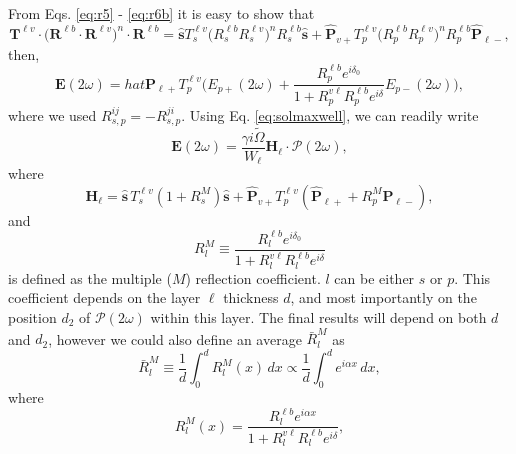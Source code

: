 From Eqs. \eqref{eq:r5} - \eqref{eq:r6b} it is easy to show that
\begin{equation*}\label{eq:m1}
\mathbf{T}^{\ell v}\cdot
\Big(\mathbf{R}^{\ell b}\cdot\mathbf{R}^{\ell v}\Big)^{n}\cdot
\mathbf{R}^{\ell b}
= \hat{\mathbf{s}}T^{\ell v}_{s}
  \Big(R^{\ell b}_{s}R^{\ell v}_{s}\Big)^{n}R^{\ell b}_{s}\hat{\mathbf{s}}
+ \hat{\mathbf{P}}_{v+}T^{\ell v}_{p}\Big(R^{\ell b}_{p}R^{\ell v}_{p}\Big)^n 
  R^{\ell b}_{p} 
\hat{\mathbf{P}}_{\ell-},
\end{equation*}
then,
\begin{equation}\label{eq:E2wreduced}
\mathbf{E}(2\omega) 
=  hat{\mathbf{P}}_{\ell +}T^{\ell v}_{p}
\Big(
E_{p+}(2\omega) +
\frac{R^{\ell b}_{p}e^{i\delta_{0}}}{1 + R^{v\ell}_{p}R^{\ell b}_{p}e^{i\delta}}
E_{p-}(2\omega) 
\Big),
\end{equation}
where we used $R^{ij}_{s,p}=-R^{ji}_{s,p}$. Using Eq. \eqref{eq:solmaxwell}, we
can readily write
\begin{equation}\label{eq:mr8}
\mathbf{E}(2\omega) =
\frac{\gamma i\tilde{\Omega}}{W_{\ell}}\mathbf{H}_{\ell}\cdot
\boldsymbol{\mathcal{P}}(2\omega),
\end{equation}
where
\begin{equation}\label{eq:mr9}
\mathbf{H}_{\ell}
= \hat{\mathbf{s}}\,T_{s}^{\ell v}
\left(1+ R^{M}_{s}\right)\hat{\mathbf{s}} + \hat{\mathbf{P}}_{v+}T_{p}^{\ell v}
\left(\hat{\mathbf{P}}_{\ell +} + R^{M}_{p}\hat{\mathbf{P}}_{\ell -}\right),
\end{equation}
and
\begin{equation}\label{m61}
R^{M}_{l}\equiv
\frac{R^{\ell b}_{l}e^{i\delta_{0}}}
     {1+R^{v\ell}_{l} R^{\ell b}_{l}e^{i\delta}}
\end{equation}
is defined as the multiple ($M$) reflection coefficient. $l$ can be either $s$
or $p$. This coefficient depends on the layer $\ell$ thickness $d$, and most
importantly on the position $d_{2}$ of $\boldsymbol{\mathcal P}(2\omega)$ within
this layer. The final results will depend on both $d$ and $d_{2}$, however we
could also define an average $\bar{R}^{M}_{l}$ as
\begin{equation}\label{eq:mcave}
\bar{R}^{M}_{l}\equiv 
\frac{1}{d}\int_{0}^{d}R^{M}_{l}(x)\,dx\propto
\frac{1}{d}\int_{0}^{d}e^{i\alpha x}\,dx,
\end{equation}
where
\begin{equation}\label{eq:m16}
R^{M}_{l}(x) = 
\frac{R^{\ell b}_{l}e^{i\alpha x}}{1 + R^{v\ell}_{l}R^{\ell b}_{l}e^{i\delta}},
\end{equation}
